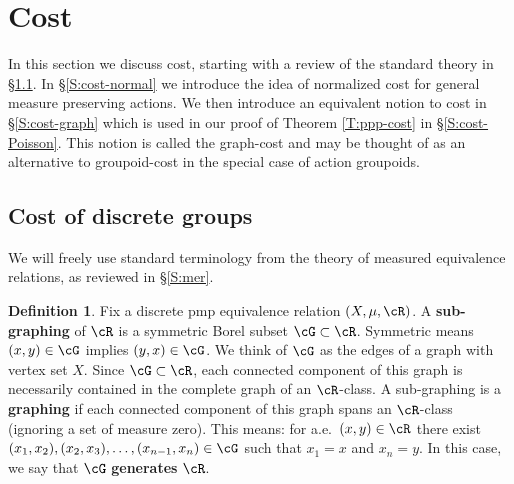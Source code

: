 \documentclass[12pt]{article}
\theoremstyle{plain}
\theoremstyle{definition}
\newtheorem{defn}{Definition}
\theoremstyle{remark}
\newcommand{\G}{\Gamma}
\def\cc{{\curvearrowright}}
\begin{document}
\section{Cost}\label{S:cost}




In this section we discuss cost, starting with a review of the standard theory in \S \ref{S:cost-eq}. 
In \S \ref{S:cost-normal} we introduce the idea of normalized cost for general measure preserving actions.
We then introduce an equivalent notion to cost in \S \ref{S:cost-graph} which is used in our proof of Theorem \ref{T:ppp-cost} in \S \ref{S:cost-Poisson}.
This notion is called the graph-cost and may be thought of as an alternative to groupoid-cost in the special case of action groupoids. 

\subsection{Cost of discrete groups}\label{S:cost-eq}
We will freely use standard terminology from the theory of measured equivalence relations, as reviewed in \S \ref{S:mer}. 


\begin{defn}
Fix a discrete pmp equivalence relation $(X,\mu,\cR)$. A \textbf{sub-graphing} of $\cR$ is a symmetric Borel subset $\cG \subset \cR$. Symmetric means $(x,y)\in \cG$ implies $(y,x)\in \cG$. We think of $\cG$ as the edges of a graph with vertex set $X$. Since $\cG \subset \cR$, each connected component of this graph is necessarily contained in the complete graph of an $\cR$-class. A sub-graphing is a \textbf{graphing} if each connected component of this graph spans an $\cR$-class (ignoring a set of measure zero). This means: for a.e.\ $(x,y)\in \cR$ there exist $(x_1,x_2),(x_2,x_3),\ldots, (x_{n-1},x_n) \in \cG$ such that $x_1=x$ and $x_n=y$. In this case, we say that $\cG$ \textbf{generates} $\cR$. 
\end{defn}
\end{document}
